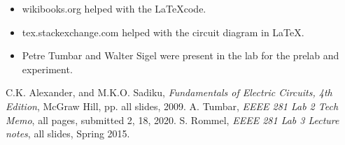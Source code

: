 \documentclass[11pt]{article}
\begin{document}
\begin{itemize}
	\item wikibooks.org helped with the \LaTeX\;code.
	\item tex.stackexchange.com helped with the circuit diagram in \LaTeX.
	\item Petre Tumbar and Walter Sigel were present in the lab for the prelab and experiment.
\end{itemize}

	

\begin{thebibliography}{9}
	C.K. Alexander, and M.K.O. Sadiku,
	\emph{Fundamentals of Electric Circuits, 4th Edition},
	McGraw Hill, pp. all slides, 2009.
A. Tumbar,
	\emph{EEEE 281 Lab 2 Tech Memo},
	all pages, submitted 2, 18, 2020.
	S. Rommel,
	\emph{EEEE 281 Lab 3 Lecture notes},
	all slides, Spring 2015.
\end{thebibliography}
\end{document}
